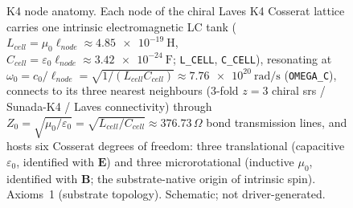 \begin{figure}[htbp]
\caption{K4 node anatomy. Each node of the chiral Laves K4 Cosserat lattice carries one intrinsic electromagnetic LC tank ($L_{cell}=\mu_0\ell_{node}\approx\SI{4.85e-19}{\henry}$, $C_{cell}=\varepsilon_0\ell_{node}\approx\SI{3.42e-24}{\farad}$;  \texttt{L\_CELL}, \texttt{C\_CELL}), resonating at $\omega_0=c_0/\ell_{node}=\sqrt{1/(L_{cell}C_{cell})}\approx\SI{7.76e20}{\radian\per\second}$ (\texttt{OMEGA\_C}), connects to its three nearest neighbours (3-fold $z=3$ chiral srs / Sunada-K4 / Laves connectivity) through $Z_0=\sqrt{\mu_0/\varepsilon_0}=\sqrt{L_{cell}/C_{cell}}\approx376.73\,\Omega$ bond transmission lines, and hosts six Cosserat degrees of freedom: three translational (capacitive $\varepsilon_0$, identified with $\mathbf{E}$) and three microrotational (inductive $\mu_0$, identified with $\mathbf{B}$; the substrate-native origin of intrinsic spin). Axioms~1 (substrate topology). Schematic; not driver-generated.}
\label{fig:vol9_node_anatomy}
\end{figure}
